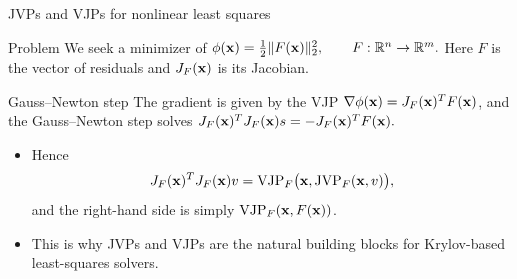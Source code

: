 \documentclass[12pt,xcolor={table}]{beamer}
\newcommand{\xbf}{{\bf x}}
\begin{document}
\begin{frame}{JVPs and VJPs for nonlinear least squares}
  \begin{block}{Problem}
    We seek a minimizer of $\phi(\xbf) = \tfrac12 \|F(\xbf)\|_2^2,\qquad F:\mathbb{R}^n \to \mathbb{R}^m.$
    Here $F$ is the vector of residuals and $J_F(\xbf)$ is its Jacobian.
  \end{block}

  \begin{block}{Gauss--Newton step}
    The gradient is given by the VJP $\nabla \phi(\xbf) = J_F(\xbf)^T F(\xbf)$,
    and the Gauss--Newton step solves
    $
    J_F(\xbf)^T J_F(\xbf) s = -J_F(\xbf)^T F(\xbf).
    $
  \end{block}

  \begin{itemize}
    \item Hence
      $$
      J_F(\xbf)^T J_F(\xbf) v
      = \mathrm{VJP}_F\big(\xbf, \mathrm{JVP}_F(\xbf, v)\big),
      $$
      and the right-hand side is simply $\mathrm{VJP}_F(\xbf, F(\xbf))$.
    \item This is why JVPs and VJPs are the natural building blocks for Krylov-based least-squares solvers.
  \end{itemize}
\end{frame}









\end{document}
